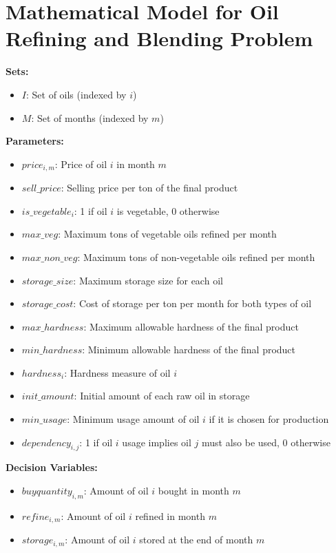 \documentclass{article}
\begin{document}
\section*{Mathematical Model for Oil Refining and Blending Problem}

\textbf{Sets:}
\begin{itemize}
    \item \( I \): Set of oils (indexed by \( i \))
    \item \( M \): Set of months (indexed by \( m \))
\end{itemize}

\textbf{Parameters:}
\begin{itemize}
    \item \( price_{i,m} \): Price of oil \( i \) in month \( m \)
    \item \( sell\_price \): Selling price per ton of the final product
    \item \( is\_vegetable_i \): 1 if oil \( i \) is vegetable, 0 otherwise
    \item \( max\_veg \): Maximum tons of vegetable oils refined per month
    \item \( max\_non\_veg \): Maximum tons of non-vegetable oils refined per month
    \item \( storage\_size \): Maximum storage size for each oil
    \item \( storage\_cost \): Cost of storage per ton per month for both types of oil
    \item \( max\_hardness \): Maximum allowable hardness of the final product
    \item \( min\_hardness \): Minimum allowable hardness of the final product
    \item \( hardness_i \): Hardness measure of oil \( i \)
    \item \( init\_amount \): Initial amount of each raw oil in storage
    \item \( min\_usage \): Minimum usage amount of oil \( i \) if it is chosen for production
    \item \( dependency_{i,j} \): 1 if oil \( i \) usage implies oil \( j \) must also be used, 0 otherwise
\end{itemize}

\textbf{Decision Variables:}
\begin{itemize}
    \item \( buyquantity_{i,m} \): Amount of oil \( i \) bought in month \( m \)
    \item \( refine_{i,m} \): Amount of oil \( i \) refined in month \( m \)
    \item \( storage_{i,m} \): Amount of oil \( i \) stored at the end of month \( m \)
\end{itemize}
\end{document}
